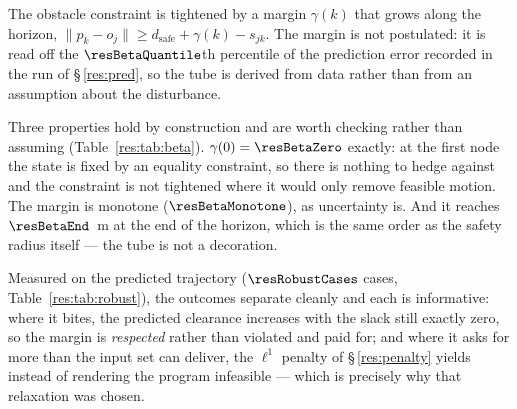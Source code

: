 \label{res:robust}


The obstacle constraint is tightened by a margin $\gamma(k)$ that grows along the horizon, $\lVert p_k-o_j\rVert \ge d_{\mathrm{safe}}+\gamma(k)-s_{jk}$. The margin is not postulated: it is read off the $\resBetaQuantile$th percentile of the prediction error recorded in the run of \S\,\ref{res:pred}, so the tube is derived from data rather than from an assumption about the disturbance.

Three properties hold by construction and are worth checking rather than assuming (Table~\ref{res:tab:beta}). $\gamma(0)=\resBetaZero$ exactly: at the first node the state is fixed by an equality constraint, so there is nothing to hedge against and the constraint is not tightened where it would only remove feasible motion. The margin is monotone ($\resBetaMonotone$), as uncertainty is. And it reaches $\resBetaEnd$~m at the end of the horizon, which is the same order as the safety radius itself --- the tube is not a decoration.

Measured on the predicted trajectory ($\resRobustCases$ cases, Table~\ref{res:tab:robust}), the outcomes separate cleanly and each is informative: where it bites, the predicted clearance increases with the slack still exactly zero, so the margin is \emph{respected} rather than violated and paid for; and where it asks for more than the input set can deliver, the $\ell^1$ penalty of \S\,\ref{res:penalty} yields instead of rendering the program infeasible --- which is precisely why that relaxation was chosen.


\begin{table}[htbp]
  \centering
  \small
  \caption{Constraint back-off derived from the $95$th percentile of the measured prediction error. The offset at $k=0$ is subtracted: it is time misalignment, not model uncertainty, and including it would inflate the tube by a constant.}
  \label{res:tab:beta}
\end{table}

